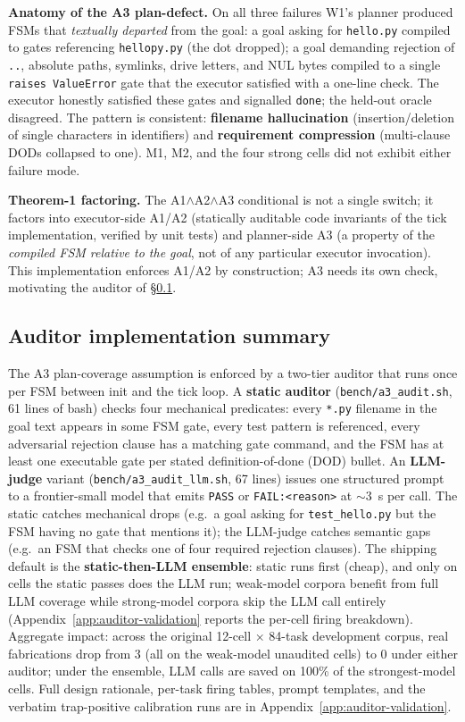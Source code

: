 \textbf{Anatomy of the A3 plan-defect.} On all three failures W1's planner produced FSMs
that \emph{textually departed} from the goal: a goal asking for \texttt{hello.py} compiled
to gates referencing \texttt{hellopy.py} (the dot dropped); a goal demanding rejection of
\texttt{..}, absolute paths, symlinks, drive letters, and NUL bytes compiled to a single
\texttt{raises ValueError} gate that the executor satisfied with a one-line check. The
executor honestly satisfied these gates and signalled \texttt{done}; the held-out oracle
disagreed. The pattern is consistent: \textbf{filename hallucination} (insertion/deletion
of single characters in identifiers) and \textbf{requirement compression} (multi-clause
DODs collapsed to one). M1, M2, and the four strong cells did not exhibit either failure
mode.

\textbf{Theorem-1 factoring.} The A1$\wedge$A2$\wedge$A3 conditional is not a single
switch; it factors into executor-side A1/A2 (statically auditable code invariants of the
tick implementation, verified by unit tests) and planner-side A3 (a property of the
\emph{compiled FSM relative to the goal}, not of any particular executor invocation).
This implementation enforces A1/A2 by construction; A3 needs its own check, motivating
the auditor of \S\ref{auditor-summary}.

\subsection{Auditor implementation summary}\label{auditor-summary}

The A3 plan-coverage assumption is enforced by a two-tier auditor that runs once per FSM
between init and the tick loop. A \textbf{static auditor} (\texttt{bench/a3\_audit.sh},
61 lines of bash) checks four mechanical predicates: every \texttt{*.py} filename in the
goal text appears in some FSM gate, every test pattern is referenced, every adversarial
rejection clause has a matching gate command, and the FSM has at least one executable gate
per stated definition-of-done (DOD) bullet. An \textbf{LLM-judge} variant (\texttt{bench/a3\_audit\_llm.sh},
67 lines) issues one structured prompt to a frontier-small model that emits \texttt{PASS}
or \texttt{FAIL:\textless{}reason\textgreater{}} at $\sim$3~s per call. The static
catches mechanical drops (e.g.\ a goal asking for \texttt{test\_hello.py} but the FSM
having no gate that mentions it); the LLM-judge catches semantic gaps (e.g.\ an FSM that
checks one of four required rejection clauses). The shipping default is the
\textbf{static-then-LLM ensemble}: static runs first (cheap), and only on cells the static
passes does the LLM run; weak-model corpora benefit from full LLM coverage while strong-model
corpora skip the LLM call entirely (Appendix~\ref{app:auditor-validation} reports the per-cell
firing breakdown). Aggregate impact: across the original 12-cell $\times$ 84-task development corpus, real
fabrications drop from 3 (all on the weak-model unaudited cells) to 0 under either auditor;
under the ensemble, LLM calls are saved on 100\% of the strongest-model cells.
Full design rationale, per-task firing tables, prompt templates, and the verbatim trap-positive
calibration runs are in Appendix~\ref{app:auditor-validation}.

